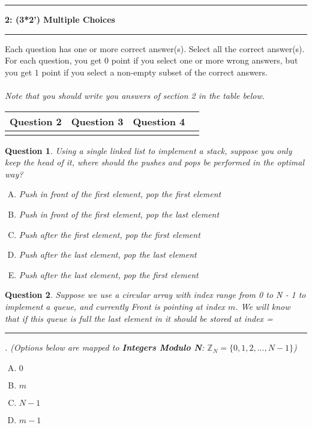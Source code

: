 \documentclass[10.5pt]{article}
\newcommand\question[2]{\vspace{.25in}\hrule\textbf{#1: #2}\vspace{.5em}\hrule\vspace{.10in}}
\newtheorem{Q}{Question}
\begin{document}
	\pagebreak

	
\question{2}{(3*2') Multiple Choices}

Each question has one or more correct answer(s). Select all the correct answer(s). For each question, you get $0$ point if you select one or more wrong answers, but you get $1$ point if you select a non-empty subset of the correct answers.\\ \\
\textit{Note that you should write you answers of section 2 in the table below.}
\begin{table}[htbp]
	\begin{tabular}{|p{2cm}|p{2cm}|p{2cm}|p{2cm}|}
		\hline 
	Question 2 & Question 3 & Question 4  \\ 
		\hline 
	 &  &  \\ 
		\hline 
	\end{tabular} 
\end{table}

\begin{Q}
	Using a single linked list to implement a stack, suppose you only keep the head of it, where should the pushes and pops be performed in the optimal way?
	\begin{enumerate}[(A)]
		\item Push in front of the first element, pop the first element
		\item Push in front of the first element, pop the last element
		\item Push after the first element, pop the first element
		\item Push after the last element, pop the last element
		\item Push after the last element, pop the first element
	\end{enumerate}
\end{Q}

\begin{Q}
 Suppose we use a circular array with index range from 0 to N - 1 to implement a queue, and currently Front is pointing at index $m$. We will know that if this queue is full the last element in it should be stored at index = \rule[-3pt]{1cm}{0.05em}. (Options below are mapped to \textbf{Integers Modulo N}: $\mathbb{Z}_N = \{0, 1, 2, ..., N-1\}$)
	\begin{enumerate}[(A)]
		\item $0$
		\item $m$
		\item $N-1$
		\item $m-1$
	\end{enumerate}
\end{Q}
\end{document}
